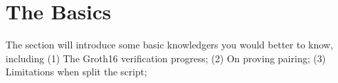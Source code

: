 \section{The Basics} \label{sec:basics}
The section will introduce some basic knowledgers you would better to know, including 
(1) The Groth16 verification progress;
(2) On proving pairing;
(3) Limitations when split the script;






